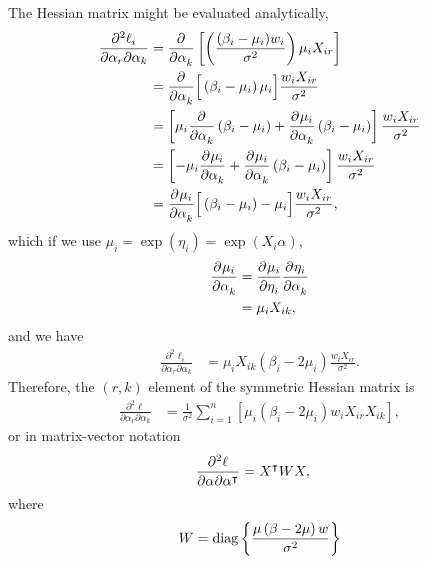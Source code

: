 The Hessian matrix might be evaluated analytically,
\begin{align*}
  \frac{\partial^2 \ell_i}{\partial \alpha_r \partial \alpha_k} &= \frac{\partial^{} }{\partial \alpha_k^{} } \left[ \left( \frac{(\beta_i - \mu_i)w_i}{\sigma^2} \right) \mu_i X_{ir} \right] \\
  &= \frac{\partial^{} }{\partial \alpha_k^{} } \Big[ \left( \beta_i - \mu_i \right) \mu_i \Big] \frac{w_i X_{ir}}{\sigma^2} \\
  &= \left[ \mu_i \frac{\partial^{} }{\partial \alpha_k^{} } \left( \beta_i - \mu_i \right) + \frac{\partial^{} \mu_i}{\partial \alpha_k^{} } \left( \beta_i - \mu_i \right) \right] \frac{w_i X_{ir}}{\sigma^2} \\
  &= \left[ - \mu_i \frac{\partial^{} \mu_i}{\partial \alpha_k^{} } + \frac{\partial^{} \mu_i}{\partial \alpha_k^{} } \left( \beta_i - \mu_i \right) \right] \frac{w_i X_{ir}}{\sigma^2} \\
  &= \frac{\partial^{} \mu_i}{\partial \alpha_k^{} } \Big[ \left( \beta_i - \mu_i \right) - \mu_i \Big] \frac{w_i X_{ir}}{\sigma^2},
\end{align*}
which if we use $\mu_i = \exp\left( \eta_i \right) = \exp\left( X_i \alpha \right)$,
\begin{align*}
  \frac{\partial^{} \mu_i}{\partial \alpha_k^{} } &= \frac{\partial^{} \mu_i}{\partial \eta_i^{} } \frac{\partial^{} \eta_i}{\partial \alpha_k^{} } \\
  &= \mu_i X_{ik},
\end{align*}
and we have
\begin{align*}
  \frac{\partial^2 \ell_i}{\partial \alpha_r \partial \alpha_k} &= \mu_i X_{ik} \left( \beta_i - 2\mu_i \right) \frac{w_i X_{ir}}{\sigma^2}.
\end{align*}
Therefore, the $(r,k)$ element of the symmetric Hessian matrix is
\begin{align*}
  \frac{\partial^2 \ell}{\partial \alpha_r \partial \alpha_k} &= \frac{1}{\sigma^2}\sum_{i=1}^n \left[ \mu_i \left( \beta_i - 2\mu_i \right) w_i X_{ir} X_{ik} \right],
\end{align*}
or in matrix-vector notation
\begin{align*}
  \frac{\partial^2 \ell}{\partial \alpha \partial \alpha^\intercal} &= X^\intercal W X,
\end{align*}
where
$$W = \mathrm{diag}\left\{ \frac{\mu \left( \beta - 2\mu \right) w}{\sigma^2} \right\} $$

